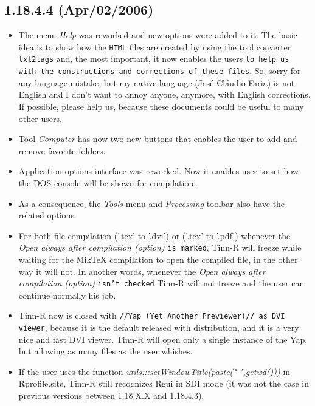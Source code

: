 \subsection{1.18.4.4 (Apr/02/2006)}

\begin{itemize}
  \item The menu \textit{Help} was reworked and new options were added to it.
    The basic idea is to show how the \texttt{HTML} files are created
    by using the tool converter \texttt{txt2tags} and, the most important,
    it now enables the users \texttt{to help us with the constructions and
      corrections of these files}. So, sorry for any language mistake, but my
    native language (José Cláudio Faria) is not English and I don't want
    to annoy anyone, anymore, with English corrections. If possible,
    please help us, because these documents could be useful to many other users.
  \item Tool \textit{Computer} has now two new buttons that enables the user
    to add and remove favorite folders.
  \item Application options interface was reworked. Now it enables user
    to set how the DOS console will be shown for compilation.
  \item As a consequence, the \textit{Tools} menu and \textit{Processing}
    toolbar also have the related options.
  \item For both file compilation ('.tex' to '.dvi') or ('.tex' to '.pdf')
    whenever the \textit{Open always after compilation (option)} \texttt{is
      marked}, Tinn-R will freeze while waiting for the MikTeX compilation
    to open the compiled file, in the other way it will not. In another
    words, whenever the \textit{Open always after compilation (option)}
    \texttt{isn't checked} Tinn-R will not freeze and the user can continue
    normally his job.
  \item Tinn-R now is closed with \texttt{//Yap (Yet Another Previewer)// as
      DVI viewer}, because it is the default released with
    distribution, and it is a very nice and fast DVI viewer.
    Tinn-R will open only a single instance of the Yap, but allowing as
    many files as the user whishes.
  \item If the user uses the function
    \textit{utils:::setWindowTitle(paste("-",getwd()))} in Rprofile.site,
    Tinn-R still recognizes Rgui in SDI mode (it was not the case in previous
    versions between 1.18.X.X and 1.18.4.3).
\end{itemize}


